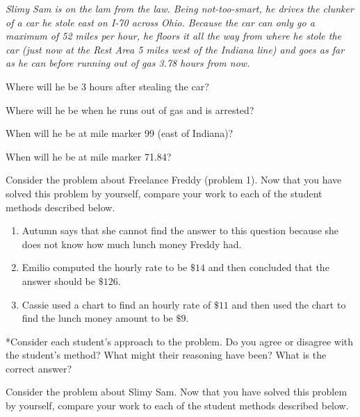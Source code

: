 \documentclass[nooutcomes, noauthor, handout]{ximera}
\begin{document}
\pagebreak
\begin{problem}
\emph{Slimy Sam is on the lam from the law.  Being not-too-smart, he drives
the clunker of a car he stole east on I-70 across Ohio.  Because the
car can only go a maximum of 52 miles per hour, he floors it all the
way from where he stole the car (just now at the Rest Area 5 miles
west of the Indiana line) and goes as far as he can before running out
of gas 3.78 hours from now.}
\begin{enumerate}[label=(\roman*)]
 \item{Where will he be 3 hours after stealing the car?
 \item Where will he be when he runs out of gas and is arrested?
 \item  When will he be at mile marker 99 (east of Indiana)?
\item When will he be at mile marker 71.84?}
\end{enumerate}

\pagebreak

\begin{problem} Consider the problem about Freelance Freddy (problem 1).  Now that you have solved this problem by yourself, compare your work to each of the student methods described below.  

\begin{enumerate}
\item Autumn says that she cannot find the answer to this question because she does not know how much lunch money Freddy had.
\item Emilio computed the hourly rate to be $\$14$ and then concluded that the answer should be $\$126$.
\item Cassie used a chart to find an hourly rate of $\$11$ and then used the chart to find the lunch money amount to be $\$9$.

\end{enumerate}

*Consider each student's approach to the problem.  Do you agree or disagree with the student's method? What might their reasoning have been?  What is the correct answer?
\end{problem}

\pagebreak
\begin{problem}
Consider the problem about Slimy Sam.  Now that you have solved this problem by yourself, compare your work to each of the student methods described below.  

\begin{enumerate}


\end{enumerate}
\end{problem}
\end{problem}
\end{document}
